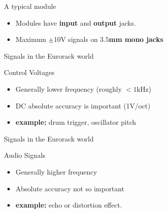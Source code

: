 \documentclass{beamer}
\begin{document}
\begin{frame}{A typical module}

    \begin{itemize}
        \item Modules have \textbf{input} and \textbf{output} jacks.
        \item Maximum $\pm$10V signals on \textbf{$3.5$mm mono jacks}
    \end{itemize}


\end{frame}

\begin{frame}{Signals in the Eurorack world}

    \begin{block}{Control Voltages}
        \begin{itemize}
            \item Generally lower frequency (roughly $<1$kHz)
            \item DC absolute accuracy is important (1V/oct)
            \item \textbf{example:} drum trigger, oscillator pitch
        \end{itemize}
    \end{block}


\end{frame}

\begin{frame}{Signals in the Eurorack world}

    \begin{block}{Audio Signals}
        \begin{itemize}
            \item Generally higher frequency
            \item Absolute accuracy not so important
            \item \textbf{example:} echo or distortion effect.
        \end{itemize}
    \end{block}


\end{frame}

\end{document}
